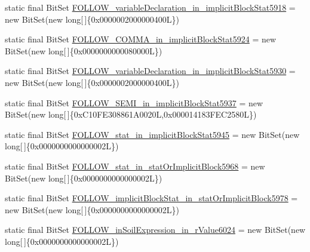 \begin{DoxyCompactItemize}
static final Bit\-Set \hyperlink{classorg_1_1tzi_1_1use_1_1parser_1_1testsuite_1_1_test_suite_parser_a6661b2d63323bfec0b5bec7cdd360db9}{F\-O\-L\-L\-O\-W\-\_\-variable\-Declaration\-\_\-in\-\_\-implicit\-Block\-Stat5918} = new Bit\-Set(new long\mbox{[}$\,$\mbox{]}\{0x0000002000000400\-L\})
\item 
static final Bit\-Set \hyperlink{classorg_1_1tzi_1_1use_1_1parser_1_1testsuite_1_1_test_suite_parser_afe232e2c104fdeabc292277c4da80ff9}{F\-O\-L\-L\-O\-W\-\_\-\-C\-O\-M\-M\-A\-\_\-in\-\_\-implicit\-Block\-Stat5924} = new Bit\-Set(new long\mbox{[}$\,$\mbox{]}\{0x0000000000080000\-L\})
\item 
static final Bit\-Set \hyperlink{classorg_1_1tzi_1_1use_1_1parser_1_1testsuite_1_1_test_suite_parser_a9f9870c22398a84cc9f443a2c5cad983}{F\-O\-L\-L\-O\-W\-\_\-variable\-Declaration\-\_\-in\-\_\-implicit\-Block\-Stat5930} = new Bit\-Set(new long\mbox{[}$\,$\mbox{]}\{0x0000002000000400\-L\})
\item 
static final Bit\-Set \hyperlink{classorg_1_1tzi_1_1use_1_1parser_1_1testsuite_1_1_test_suite_parser_a8a33a990dedafb01be5c14103a806e6a}{F\-O\-L\-L\-O\-W\-\_\-\-S\-E\-M\-I\-\_\-in\-\_\-implicit\-Block\-Stat5937} = new Bit\-Set(new long\mbox{[}$\,$\mbox{]}\{0x\-C10\-F\-E308861\-A0020\-L,0x000014183\-F\-E\-C2580\-L\})
\item 
static final Bit\-Set \hyperlink{classorg_1_1tzi_1_1use_1_1parser_1_1testsuite_1_1_test_suite_parser_a2bfc0549ffbc0bab9e3f4b0006a70afd}{F\-O\-L\-L\-O\-W\-\_\-stat\-\_\-in\-\_\-implicit\-Block\-Stat5945} = new Bit\-Set(new long\mbox{[}$\,$\mbox{]}\{0x0000000000000002\-L\})
\item 
static final Bit\-Set \hyperlink{classorg_1_1tzi_1_1use_1_1parser_1_1testsuite_1_1_test_suite_parser_a6c7d59f2fc97d24182f4c79734fff36f}{F\-O\-L\-L\-O\-W\-\_\-stat\-\_\-in\-\_\-stat\-Or\-Implicit\-Block5968} = new Bit\-Set(new long\mbox{[}$\,$\mbox{]}\{0x0000000000000002\-L\})
\item 
static final Bit\-Set \hyperlink{classorg_1_1tzi_1_1use_1_1parser_1_1testsuite_1_1_test_suite_parser_a798eb9cd6b7a26c56c136234380b8d8f}{F\-O\-L\-L\-O\-W\-\_\-implicit\-Block\-Stat\-\_\-in\-\_\-stat\-Or\-Implicit\-Block5978} = new Bit\-Set(new long\mbox{[}$\,$\mbox{]}\{0x0000000000000002\-L\})
\item 
static final Bit\-Set \hyperlink{classorg_1_1tzi_1_1use_1_1parser_1_1testsuite_1_1_test_suite_parser_a04f8813d32e3fdf20e2844f566393746}{F\-O\-L\-L\-O\-W\-\_\-in\-Soil\-Expression\-\_\-in\-\_\-r\-Value6024} = new Bit\-Set(new long\mbox{[}$\,$\mbox{]}\{0x0000000000000002\-L\})

\end{DoxyCompactItemize}
